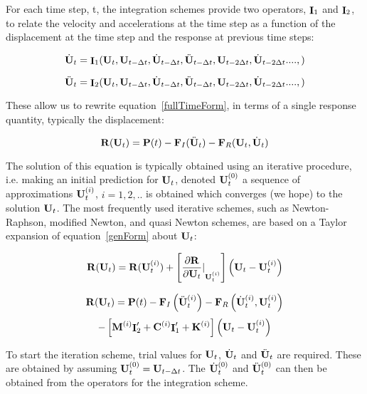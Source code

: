 For each time step, t, the integration schemes provide two operators,
$\mathop{\cal {\bf I}}_1$ and $\mathop{\cal {\bf I}}_2$, to relate the velocity and accelerations at the 
time step as a function of the displacement at the time step and the
response at previous time steps: 

\begin{equation} 
\dot {{\bf U}}_{t} = {\mathop{\cal {\bf I}}}_1 ({\bf U}_t, {\bf U}_{t-\Delta t}, \dot {{\bf U}}_{t-\Delta t},
\ddot {{\bf U}}_{t - \Delta t}, {\bf U}_{t - 2\Delta t}, \dot {{\bf U}}_{t - 2 \Delta t}. ..., )
\label{I1}
\end{equation} 

\begin{equation} 
\ddot {{\bf U}}_{t} = {\mathop{\cal {\bf I}}}_2 ({\bf U}_t, {\bf U}_{t-\Delta t}, \dot {{\bf U}}_{t-\Delta t},
\ddot {{\bf U}}_{t - \Delta t}, {\bf U}_{t - 2\Delta t}, \dot {{\bf U}}_{t - 2 \Delta t}. ..., )
\label{I2}
\end{equation} 

These allow us to rewrite equation~\ref{fullTimeForm}, in terms of a
single response quantity, typically the displacement:

\begin{equation}
{\bf R}({\bf U}_t) = {\bf P}(t) - {\bf F}_I(\ddot{\bf U}_t) - {\bf F}_R({\bf U}_t, \dot{\bf U}_t)
\label{genForm}
\end{equation}

The solution of this equation is typically obtained using an iterative
procedure, i.e. making an initial prediction for ${\bf U}_{t}$,
denoted ${\bf U}_{t}^{(0)}$ a sequence of approximations ${\bf U}_{t}^{(i)}$,
$i=1,2, ..$ is obtained which converges (we hope) to the solution ${\bf U}_{t}$. The
most frequently used iterative schemes, such as Newton-Raphson,
modified Newton, and quasi Newton schemes, are based on a Taylor
expansion of equation~\ref{genForm} about ${\bf U}_{t}$:    

\begin{equation} 
{\bf R}({\bf U}_{t}) = 
{\bf R}({\bf U}_{t}^{(i)}) +
\left[ {\frac{\partial {\bf R}}{\partial {\bf U}_t} \vert}_{{\bf U}_{t}^{(i)}}\right]
\left( {\bf U}_{t} - {\bf U}_{t}^{(i)} \right) 
\end{equation}

$$
{\bf R}({\bf U}_{t}) = 
 {\bf P} (t) 
 - {\bf F}_{I} \left( \ddot {{\bf U}}_{t}^{(i)} \right) -
{\bf F}_{R} \left( \dot {{\bf U}}_{t}^{(i)}, {\bf U}_{t}^{(i)} \right)
$$
\begin{equation} 
- \left[
   {\bf M}^{(i)} {\mathop{\cal {\bf I}}}_2'
+  {\bf C}^{(i)} {\mathop{\cal {\bf I}}}_1'
+ {\bf K}^{(i)}  \right]
 \left( {\bf U}_{t} - {\bf U}_{t}^{(i)} \right)
\label{femGenFormTaylor}
\end{equation} 

To start the iteration scheme, trial values for ${\bf U}_{t}$, $\dot
{{\bf U}}_{t} $ and $\ddot {{\bf U}}_{t} $ are required. These are
obtained by assuming ${\bf U}_{t}^{(0)} = {\bf U}_{t-\Delta t}$. The
$\dot {{\bf U}}_{t}^{(0)} $ and $\ddot {{\bf U}}_{t}^{(0)}$
can then be obtained from the operators for the integration scheme. \\

